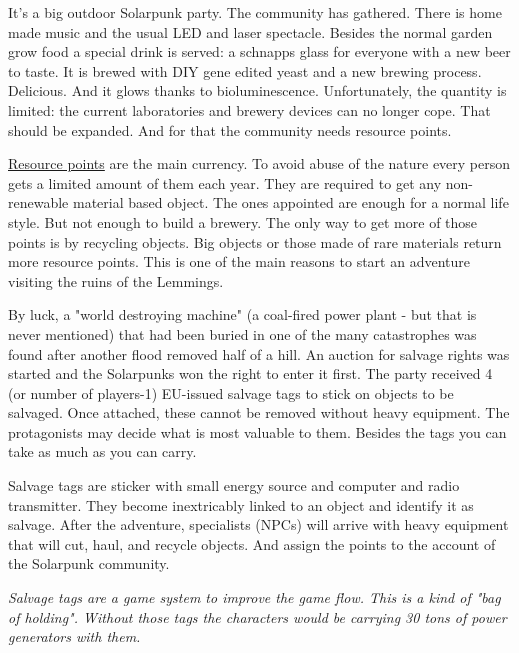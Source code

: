 It's a big outdoor Solarpunk party. The community has gathered. There is home made music and the usual LED and laser spectacle. Besides the normal garden grow food a special drink is served: a schnapps glass for everyone with a new beer to taste.
It is brewed with DIY gene edited yeast and a new brewing process. Delicious. And it glows thanks to bioluminescence. Unfortunately, the quantity is limited: the current laboratories and brewery devices can no longer cope. That should be expanded. And for that the community needs resource points.

\begin{sidebarBox}[title=Resource points]
\hyperref[sec:Resource points]{Resource points} are the main currency. To avoid abuse of the nature every person gets a limited amount of them each year. They are required to get any non-renewable  material based object. The ones appointed are enough for a normal life style. But not enough to build a brewery. The only way to get more of those points is by recycling objects. Big objects or those made of rare materials return more resource points. This is one of the main reasons to start an adventure visiting the ruins of the Lemmings. 
\end{sidebarBox}

By luck, a "world destroying machine" (a coal-fired power plant - but that is never mentioned) that had been buried in one of the many catastrophes was found after another flood removed half of a hill. An auction for salvage rights was started and the Solarpunks won the right to enter it first.
The party received 4 (or number of players-1) EU-issued salvage tags to stick on objects to be salvaged. Once attached, these cannot be removed without heavy equipment. The protagonists may decide what is most valuable to them. Besides the tags you can take as much as you can carry.

\begin{sidebarBox}[title=Salvage tags]
Salvage tags are sticker with small energy source and computer and radio transmitter. They become inextricably linked to an object and identify it as salvage. After the adventure, specialists (NPCs) will arrive with heavy equipment that will cut, haul, and recycle objects. And assign the points to the account of the Solarpunk community.
\end{sidebarBox}

\emph{Salvage tags are a game system to improve the game flow. This is a kind of "bag of holding". Without those tags the characters would be carrying 30 tons of power generators with them.}

